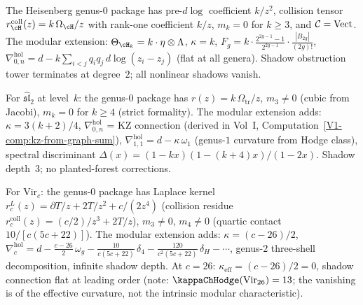 \begin{computation}
The Heisenberg genus-$0$ package has pre-\textup{\(d\log\)}
coefficient $k/z^2$, collision tensor
$r^{\mathrm{coll}}_{\cH}(z)=k\,\Omega_{\cH}/z$ with rank-one
coefficient $k/z$, $m_k=0$ for $k\ge 3$,
and $\mathcal C=\mathrm{Vect}$.
The modular extension:
$\Theta_{\cH_k}=k\cdot\eta\otimes\Lambda$,
$\kappa=k$,
$F_g=k\cdot \tfrac{2^{2g-1}-1}{2^{2g-1}}\cdot\tfrac{|B_{2g}|}{(2g)!}$,
$\nabla^{\mathrm{hol}}_{0,n}
=d-k\sum_{i<j}q_iq_j\,d\log(z_i-z_j)$
(flat at all genera).
Shadow obstruction tower terminates at degree~$2$; all nonlinear
shadows vanish.
\end{computation}

\begin{computation}
For $\widehat{\mathfrak{sl}}_2$ at level~$k$: the genus-$0$
package has $r(z)=k\,\Omega_{\mathrm{tr}}/z$, $m_3\neq 0$ (cubic from Jacobi),
$m_k=0$ for $k\ge 4$ (strict formality).
The modular extension adds:
$\kappa=3(k+2)/4$,
$\nabla^{\mathrm{hol}}_{0,n}$ = KZ connection
(derived in Vol~I,
Computation~\ref*{V1-comp:kz-from-graph-sum}),
$\nabla^{\mathrm{hol}}_{1,1}=d-\kappa\,\omega_1$
(genus-$1$ curvature from Hodge class),
spectral discriminant
$\Delta(x)=(1-kx)(1-(k{+}4)x)/(1-2x)$.
Shadow depth~$3$; no planted-forest corrections.
\end{computation}

\begin{computation}
For $\mathrm{Vir}_c$: the genus-$0$ package has
Laplace kernel $r^L_c(z)=\partial T/z+2T/z^2+c/(2z^4)$
(collision residue $r^{\mathrm{coll}}_c(z)=(c/2)/z^3+2T/z$),
$m_3\neq 0$, $m_4\neq 0$
(quartic contact $10/[c(5c+22)]$).
The modular extension adds:
$\kappa=(c-26)/2$,
$\nabla^{\mathrm{hol}}_c
=d-\frac{c-26}{2}\,\omega_g
-\frac{10}{c(5c+22)}\,\delta_4
-\frac{120}{c^2(5c+22)}\,\delta_H-\cdots$,
genus-$2$ three-shell decomposition, infinite shadow depth.
At $c=26$: $\kappa_{\mathrm{eff}}=(c-26)/2=0$, shadow connection flat at leading order (note: $\kappaChHodge(\mathrm{Vir}_{26})=13$; the vanishing is of the effective curvature, not the intrinsic modular characteristic).
\end{computation}


